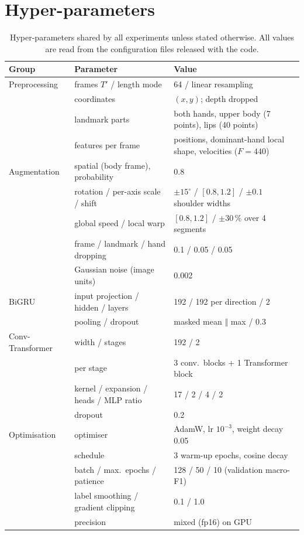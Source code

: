 \section{Hyper-parameters}
\label{app:hparams}

\begin{table}[!ht]
  \centering
  \caption{Hyper-parameters shared by all experiments unless stated otherwise. All values are
  read from the configuration files released with the code.}
  \label{tab:hparams}
  \small
  \begin{tabular}{llp{5.0cm}}
    \toprule
    Group & Parameter & Value \\
    \midrule
    Preprocessing & frames $T'$ / length mode & 64 / linear resampling \\
                  & coordinates & $(x, y)$; depth dropped \\
                  & landmark parts & both hands, upper body (7 points), lips (40 points) \\
                  & features per frame & positions, dominant-hand local shape, velocities ($F=440$) \\
    \midrule
    Augmentation  & spatial (body frame), probability & 0.8 \\
                  & rotation / per-axis scale / shift & $\pm15^\circ$ / $[0.8, 1.2]$ / $\pm0.1$ shoulder widths \\
                  & global speed / local warp & $[0.8, 1.2]$ / $\pm30\,\%$ over 4 segments \\
                  & frame / landmark / hand dropping & 0.1 / 0.05 / 0.05 \\
                  & Gaussian noise (image units) & 0.002 \\
    \midrule
    BiGRU         & input projection / hidden / layers & 192 / 192 per direction / 2 \\
                  & pooling / dropout & masked mean $\Vert$ max / 0.3 \\
    \midrule
    Conv-Transformer & width / stages & 192 / 2 \\
                  & per stage & 3 conv.\ blocks + 1 Transformer block \\
                  & kernel / expansion / heads / MLP ratio & 17 / 2 / 4 / 2 \\
                  & dropout & 0.2 \\
    \midrule
    Optimisation  & optimiser & AdamW, lr $10^{-3}$, weight decay 0.05 \\
                  & schedule & 3 warm-up epochs, cosine decay \\
                  & batch / max.\ epochs / patience & 128 / 50 / 10 (validation macro-F1) \\
                  & label smoothing / gradient clipping & 0.1 / 1.0 \\
                  & precision & mixed (fp16) on GPU \\
    \bottomrule
  \end{tabular}
\end{table}

